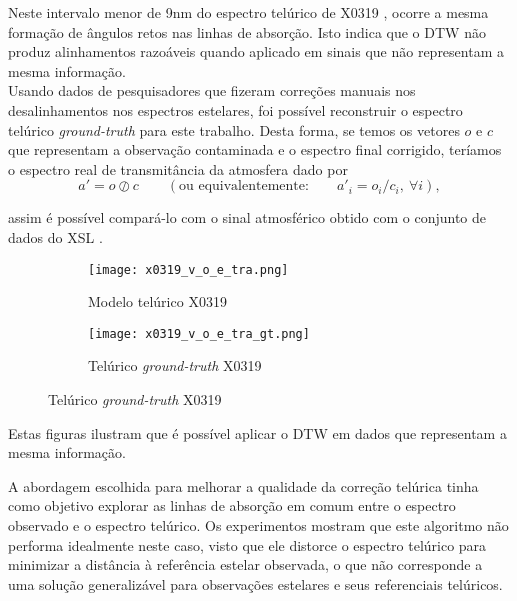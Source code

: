 \documentclass[a1]{sciposter}
\begin{document}
\begin{multicols}{2}
Neste intervalo menor de 9nm do espectro telúrico de X0319 \cite{Chen2014TheXS}, ocorre a mesma formação de ângulos retos nas linhas de absorção. Isto indica que o DTW não produz alinhamentos razoáveis quando aplicado em sinais que não representam a mesma informação.\\

Usando dados de pesquisadores \cite{unpublished-xshooter-data-release} que fizeram correções manuais nos desalinhamentos nos espectros estelares, foi possível reconstruir o espectro telúrico \textit{ground-truth} para este trabalho. Desta forma, se temos os vetores $o$ e $c$ que representam a observação contaminada e o espectro final corrigido, teríamos o espectro real de transmitância da atmosfera dado por
\begin{equation*}
    a' = o \oslash c \qquad \left(\mbox{ou equivalentemente:} \qquad a'_{i} = o_i / c_i,\ \forall i\right),
\end{equation*}

assim é possível compará-lo com o sinal atmosférico obtido com o conjunto de dados do XSL \cite{Chen2014TheXS}.

\begin{figure}
 \centering
 \begin{subfigure}{0.4\textwidth}
  \centering
  \texttt{[image: x0319\_v\_o\_e\_tra.png]}
  \caption{Modelo telúrico X0319}
 \end{subfigure}\hfil
 \begin{subfigure}{0.4\textwidth}
  \centering
  \texttt{[image: x0319\_v\_o\_e\_tra\_gt.png]}
  \caption{Telúrico \textit{ground-truth} X0319}
 \end{subfigure}\hfil
\end{figure}

Estas figuras ilustram que é possível aplicar o DTW em dados que representam a mesma informação.


A abordagem escolhida para melhorar a qualidade da correção telúrica tinha como objetivo explorar as linhas de absorção em comum entre o espectro observado e o espectro telúrico. Os experimentos mostram que este algoritmo não performa idealmente neste caso, visto que ele distorce o espectro telúrico para minimizar a distância à referência estelar observada, o que não corresponde a uma solução generalizável para observações estelares e seus referenciais telúricos. 

% 





\end{multicols}
\end{document}
